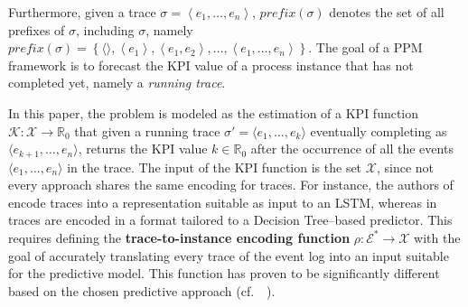 \documentclass[manuscript,screen,review]{acmart}
\newcommand{\ME}{\mathcal{E}}
\newcommand{\MV}{\mathcal{V}}
\newcommand{\MK}{\mathcal{K}}
\newcommand{\RR}{\mathbb{R}}
\begin{document}
\noindent
Furthermore, given a trace $\sigma=\left\langle e_{1}, \ldots, e_{n}\right\rangle$, $prefix\left(\sigma\right)$ denotes the set of all prefixes of $\sigma$, including $\sigma$, namely $prefix\left(\sigma\right)=\left\{\langle\rangle,\left\langle e_{1}\right\rangle,\left\langle e_{1}, e_{2}\right\rangle, \ldots,\left\langle e_{1}, \ldots, e_{n}\right\rangle\right\}$. 
The goal of a PPM framework is to forecast the KPI value of a process instance that has not completed yet, namely a \textit{running trace}. 

In this paper, the problem is modeled as the estimation of a KPI function $\MK:\mathcal{X}\rightarrow\RR_0$ that given a running trace $\sigma'=\langle e_1,\ldots, e_k\rangle$ eventually completing as $\langle e_{k+1},\ldots,e_n\rangle$, %
returns the KPI value $k\in \RR_0$ after the occurrence of all the events $\langle e_{1},\ldots,e_n\rangle$ in the trace. The input of the KPI function is the set $\mathcal{X}$, since not every approach shares the same encoding for traces. For instance, the authors of~\cite{10.1007/978-3-031-59465-6_10} encode traces into a representation suitable as input to an LSTM, whereas in~\cite{DBLP:journals/dke/ShoushD25} traces are encoded in a format tailored to a Decision Tree–based predictor. This requires defining the \textbf{trace-to-instance encoding function} $\rho:\ME^*\rightarrow \mathcal{X}$ with the goal of accurately translating every trace of the event log into an input suitable for the predictive model. This function has proven to be significantly different based on the chosen predictive approach (cf.\ ~\cite{crvl3}).
\end{document}
